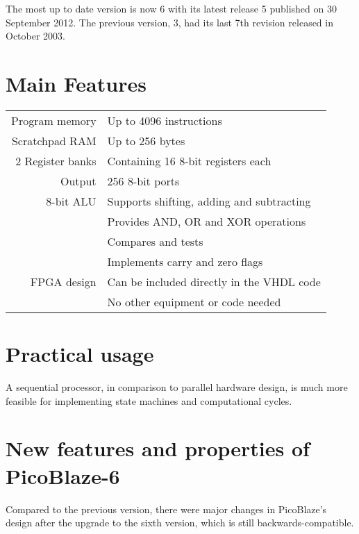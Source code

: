 The most up to date version is now 6 with its latest release 5 published on 30 September 2012. The previous version, 3, had its last 7th revision released in October 2003. %

    \section{Main Features}

    \begin{center}
    \begin{tabular}{ @{\extracolsep{\fill} } r | l }
        Program memory & Up to 4096 instructions \\

        Scratchpad RAM & Up to 256 bytes \\

        2 Register banks & Containing 16 8-bit registers each\\

        Output & 256 8-bit ports \\

        8-bit ALU & Supports shifting, adding and subtracting \\
                  & Provides AND, OR and XOR operations \\
                  & Compares and tests \\
                  & Implements carry and zero flags \\

        FPGA design & Can be included directly in the VHDL code \\
                    & No other equipment or code needed \\
    \end{tabular}
    \end{center}

    \section{Practical usage}

    A sequential processor, in comparison to parallel hardware design, is much more feasible for implementing state machines and computational cycles.

    \section{New features and properties of PicoBlaze-6}

    Compared to the previous version, there were major changes in PicoBlaze's design after the upgrade to the sixth version, which is still backwards-compatible.

